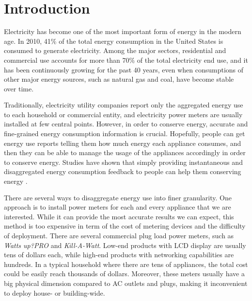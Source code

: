 \chapter{Introduction}\label{chap1}

Electricity has become one of the most important form of energy in the modern age. In 2010, 41\% of the total energy consumption in the United States is consumed to generate electricity. Among the major sectors, residential and commercial use accounts for more than 70\% of the total electricity end use, and it has been continuously growing for the past 40 years, even when consumptions of other major energy sources, such as natural gas and coal, have become stable over time. \cite{U.S.EnergyInformationAdministration2011}

Traditionally, electricity utility companies report only the aggregated energy use to each household or commercial entity, and electricity power meters are usually installed at few central points. However, in order to conserve energy, accurate and fine-grained energy consumption information is crucial. Hopefully, people can get energy use reports telling them how much energy each appliance consumes, and then they can be able to manage the usage of the appliances accordingly in order to conserve energy. Studies have shown that simply providing instantaneous and disaggregated energy consumption feedback to people can help them conserving energy \cite{Darby2006,Parker2006,Fischer2008}.


There are several ways to disaggregate energy use into finer granularity. One approach is to install power meters for each and every appliance that we are interested. While it can provide the most accurate results we can expect, this method is too expensive in term of the cost of metering devices and the difficulty of deployment. There are several commercial plug load power meters, such as \textit{Watts up?PRO} and \textit{Kill-A-Watt}. Low-end products with LCD display are usually tens of dollars each, while high-end products with networking capabilities are hundreds. In a typical household where there are tens of appliances, the total cost could be easily reach thousands of dollars. Moreover, these meters usually have a big physical dimension compared to AC outlets and plugs, making it inconvenient to deploy house- or building-wide. 

